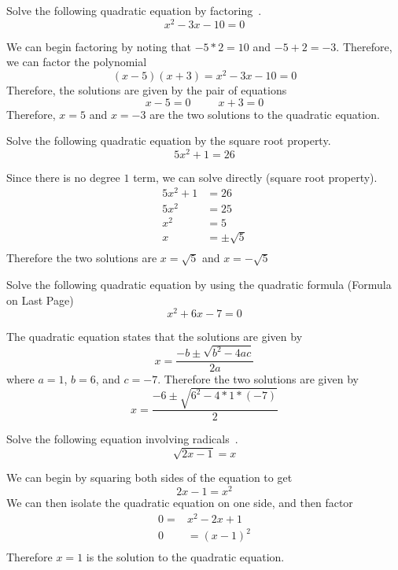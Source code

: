 \documentclass[addpoints,12pt]{exam}
\begin{document}
\begin{questions}
\question Solve the following quadratic equation by factoring~. 
\[
	x^{2}-3x-10=0 
\]

\begin{solution}
    We can begin factoring by noting that $-5*2=10$ and $-5+2 = -3$. Therefore, we can factor the polynomial 
		\[
			(x-5)(x+3) = x^{2}-3x-10 = 0 
		\]
		Therefore, the solutions are given by the pair of equations 
		\[
		x-5 = 0 \hspace{30pt} x+3 = 0 
		\]
		Therefore, $x=5$ and $x=-3$ are the two solutions to the quadratic equation. 
\end{solution}

\question Solve the following quadratic equation by the square root property. 
   \[
   5x^{2}+1=26
   \]

	 \begin{solution}
	     Since there is no degree $1$ term, we can solve directly (square root property). 
			 \begin{align*}
				 5x^{2}+1 & = 26 \\
				 5x^{2} & = 25 \\
				 x^{2} & = 5 \\
				 x & = \pm \sqrt{5}\\
			 \end{align*}
			 Therefore the two solutions are $x = \sqrt{5}$ and $x = -\sqrt{5}$
	 \end{solution}
\question Solve the following quadratic equation by using the quadratic formula (Formula on Last Page)
   \[
x^{2}+6x-7=0
\]

\begin{solution}
    The quadratic equation states that the solutions are given by 
		\[
		x = \frac{-b\pm \sqrt{b^{2}-4ac}}{2a}
		\]
		where $a = 1$, $b = 6$, and $c = -7$. Therefore the two solutions are given by 
		\[
		x = \frac{-6\pm \sqrt{6^{2}-4*1*(-7)}}{2}
		\]
\end{solution}
\question Solve the following equation involving radicals~.
   \[
    \sqrt{2x-1}=x
	 \]
\begin{solution}
    We can begin by squaring both sides of the equation to get 
		\[
		2x-1 = x^{2}
		\]
		We can then isolate the quadratic equation on one side, and then factor 
	\begin{align*}
	    0 = & x^{2}-2x+1 \\
			0 & = (x-1)^{2} \\
	\end{align*}
	Therefore $x=1$ is the solution to the quadratic equation.
\end{solution}
	     


\end{questions}
\end{document}
